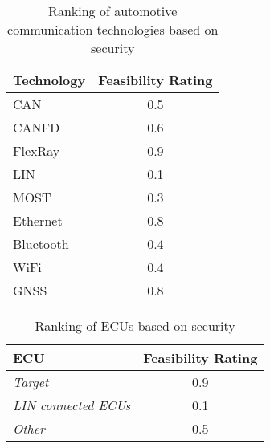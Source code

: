 \begin{table}[h]
    \label{table:bus_rating}
    \centering
    \begin{tabular}{|l|c|}
    \hline
    \textbf{Technology} & \textbf{Feasibility Rating} \\
    \hline
    CAN & 0.5 \\
    CANFD & 0.6 \\
    FlexRay & 0.9 \\
    LIN & 0.1 \\
    MOST & 0.3 \\
    Ethernet & 0.8 \\
    Bluetooth & 0.4 \\
    WiFi & 0.4 \\
    GNSS & 0.8 \\
    \hline
    \end{tabular}
    \caption{Ranking of automotive communication technologies based on security}
\end{table}

\begin{table}[h]
    \label{table:ecu_rating}
    \centering
    \begin{tabular}{|l|c|}
    \hline
    \textbf{ECU} & \textbf{Feasibility Rating} \\
    \hline
    \textit{Target} & 0.9 \\
    \textit{LIN connected ECUs} & 0.1 \\
    \textit{Other} & 0.5 \\
    \hline
    \end{tabular}
    \caption{Ranking of ECUs based on security}
\end{table}